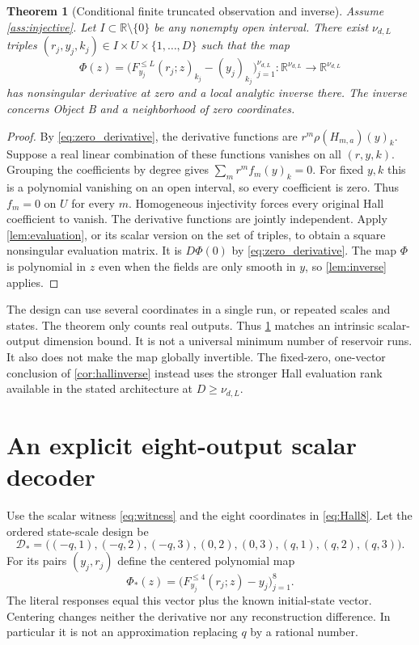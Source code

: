 \documentclass[11pt,a4paper]{article}
\numberwithin{equation}{section}
\newtheorem{theorem}{Theorem}[section]
\theoremstyle{definition}
\theoremstyle{remark}
\newcommand{\R}{\mathbb R}
\begin{document}
\begin{theorem}[Conditional finite truncated observation and inverse]
\label{thm:finite}
Assume \cref{ass:injective}. Let $I\subset\R\setminus\{0\}$ be any
nonempty open interval. There exist $\nu_{d,L}$ triples
$(r_j,y_j,k_j)\in I\times U\times\{1,\ldots,D\}$ such that the map
\[
 \Phi(z)=\bigl(F_{y_j}^{\leq L}(r_j;z)_{k_j}-(y_j)_{k_j}\bigr)
 _{j=1}^{\nu_{d,L}}:\R^{\nu_{d,L}}\longrightarrow\R^{\nu_{d,L}}
\]
has nonsingular derivative at zero and a local analytic inverse there.
The inverse concerns Object B and a neighborhood of zero coordinates.
\end{theorem}
\begin{proof}
By \eqref{eq:zero_derivative}, the derivative functions are
$r^m\rho(H_{m,a})(y)_k$.
Suppose a real linear combination of these functions vanishes on all
$(r,y,k)$. Grouping the coefficients by degree gives
$\sum_m r^m f_m(y)_k=0$. For fixed $y,k$ this is a polynomial vanishing
on an open interval, so every coefficient is zero. Thus $f_m=0$ on $U$
for every $m$. Homogeneous injectivity forces every original Hall
coefficient to vanish. The derivative functions are jointly independent.
Apply \cref{lem:evaluation}, or its scalar version on the set of triples,
to obtain a square nonsingular evaluation matrix. It is $D\Phi(0)$ by
\eqref{eq:zero_derivative}. The map $\Phi$ is polynomial in $z$ even
when the fields are only smooth in $y$, so \cref{lem:inverse} applies.
\end{proof}

The design can use several coordinates in a single run, or repeated
scales and states. The theorem only counts real outputs.
Thus \cref{thm:finite} matches an intrinsic scalar-output dimension bound.
It is not a universal minimum number of reservoir runs. It also does not
make the map globally invertible. The fixed-zero, one-vector conclusion
of \cref{cor:hallinverse} instead uses the stronger Hall evaluation rank
available in the stated architecture at $D\geq\nu_{d,L}$.

\section{An explicit eight-output scalar decoder}
\label{sec:eight}
Use the scalar witness \eqref{eq:witness} and the eight coordinates in
\eqref{eq:Hall8}. Let the ordered state-scale design be
\begin{equation}\label{eq:design}
 \mathcal D_*=\bigl((-q,1),(-q,2),(-q,3),(0,2),(0,3),
 (q,1),(q,2),(q,3)\bigr).
\end{equation}
For its pairs $(y_j,r_j)$ define the centered polynomial map
\begin{equation}\label{eq:Phi}
 \Phi_*(z)=\bigl(F_{y_j}^{\leq4}(r_j;z)-y_j\bigr)_{j=1}^8.
\end{equation}
The literal responses equal this vector plus the known initial-state
vector. Centering changes neither the derivative nor any reconstruction
difference. In particular it is not an approximation replacing $q$ by a
rational number.
\end{document}
